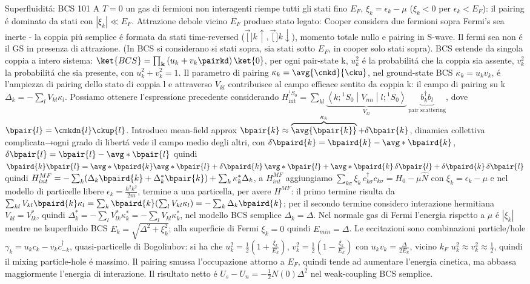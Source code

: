 \begin{frame}{Superfluidit\'a: BCS 101}
    A $T=0$ un gas di fermioni non interagenti riempe tutti gli stati fino $E_F$, $\xi_k=\epsilon_k-\mu$ ($\xi_k<0$ per $\epsilon_k<E_F$): il pairing \'e dominato da stati con $|\xi_k|\ll E_F$. Attrazione debole vicino $E_F$ produce stato legato: Cooper considera due fermioni sopra Fermi's sea inerte - la coppia pi\'u semplice \'e formata da stati time-reversed ($\vec[\mathbf]{k}\uparrow,\vec[\mathbf]{k}\downarrow$), momento totale nullo e pairing in S-wave. Il fermi sea non \'e il GS in presenza di attrazione. (In BCS si considerano si stati sopra, sia stati sotto $E_F$, in cooper solo stati sopra). BCS estende da singola coppia a intero sistema: $\ket{BCS}=\prod_{\mathbf{k}}\left(u_k + v_k \pairkd\right)\ket{0}$, per ogni pair-state k, $u_k^2$ \'e la probabilit\'a che la coppia sia assente, $v_k^2$ la probabilit\'a che sia presente, con $u_k^2+v_k^2=1$. Il parametro di pairing $\kappa_k=\avg{\cmkd}{\cku}$, nel ground-state BCS $\kappa_k=u_kv_k$, \'e l'ampiezza di pairing dello stato di coppia l e attraverso $V_{kl}$ contribuisce al campo efficace sentito da coppia k: il campo di pairing su k $\Delta_k=-\sum_lV_{kl}\kappa_l$. Possiamo ottenere l'espressione precedente considerando $H_{\mathrm{int}}^{{}^1S_0}=\sum_{kl}\underbrace{\left\langle k;{}^1S_0\middle|V_{nn}\middle|l;{}^1S_0\right\rangle}_{V_{kl}}\,\underbrace{b_k^\dagger b_l}_{\text{pair scattering}}$, dove $\bpair{l}=\cmkdn{l}\ckup{l}$. Introduco mean-field approx $\bpair{k}\approx\overbrace{\avg{\bpair{k}}}^{\kappa_k}+\delta\bpair{k}$, dinamica collettiva complicata→ogni grado di libert\'a vede il campo medio degli altri, con $\delta\bpaird{k}=\bpaird{k}-\avg*{\bpaird{k}}$, $\delta\bpair{l}=\bpair{l}-\avg*{\bpair{l}}$ quindi $\bpaird{k}\bpair{l}=\avg*{\bpaird{k}}\avg*{\bpair{l}}+\delta\bpaird{k}\,\avg*{\bpair{l}}+\avg*{\bpaird{k}}\,\delta\bpair{l}+\delta\bpaird{k}\,\delta\bpair{l}$ quindi $H_{int}^{MF}=-\sum_k(\Delta_k\bpaird{k}+\Delta_k^*\bpair{k})+\sum_k\kappa_k^*\Delta_k$, a $H_{int}^{MF}$ aggiungiamo $\sum_{k\sigma}\xi_k\,c^\dagger_{k\sigma}c_{k\sigma}=H_0-\mu\hat N$ con $\xi_k=\epsilon_k-\mu$ e nel modello di particelle libere $\epsilon_k=\frac{\hbar^2k^2}{2m}$, termine a una particella, per avere $H^{MF}$: il primo termine risulta da $\sum_{kl}V_{kl}\bpaird{k}\kappa_l=\sum_k\bpaird{k}(\sum_lV_{kl}\kappa_l)=-\sum_k\Delta_k\bpaird{k}$; per il secondo termine considero interazione hermitiana $V_{kl}=V_{lk}^*$, quindi $\Delta_k^*=-\sum_lV_{lk}^*\kappa_k^*=-\sum_lV_{kl}\kappa_k^*$, nel modello BCS semplice $\Delta_k=\Delta$. Nel normale gas di Fermi l'energia rispetto a $\mu$ \'e $|\xi_k|$ mentre ne lsuperfluido BCS $E_k=\sqrt{\Delta^2+\xi_k^2}$; alla superficie di Fermi $\xi_k=0$ quindi $E_{min}=\Delta$. Le eccitazioni sono combinazioni particle/hole $\gamma_k=u_kc_k-v_kc_{-k}^{\dag}$, quasi-particelle di Bogoliubov: si ha che $u_k^2=\frac{1}{2}(1+\frac{\xi_k}{E_k})$, $v_k^2=\frac{1}{2}(1-\frac{\xi_k}{E_k})$ con $u_kv_k=\frac{\Delta}{2E_k}$, vicino $k_F$ $u_k^2\approx v_k^2\approx \frac{1}{2}$, quindi il mixing particle-hole \'e massimo. Il pairing smussa l'occupazione attorno a $E_F$, quindi tende ad aumentare l'energia cinetica, ma abbassa maggiormente l'energia di interazione. Il risultato netto \'e $U_s-U_n = -\frac{1}{2}N(0)\Delta^2$ nel weak-coupling BCS semplice.

\end{frame}
